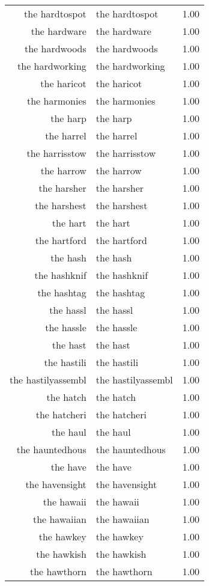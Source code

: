 \begin{table}[ht]
\begin{tabular}{rlr}
  the hardtospot & the hardtospot & 1.00 \\ 
  the hardware & the hardware & 1.00 \\ 
  the hardwoods & the hardwoods & 1.00 \\ 
  the hardworking & the hardworking & 1.00 \\ 
  the haricot & the haricot & 1.00 \\ 
  the harmonies & the harmonies & 1.00 \\ 
  the harp & the harp & 1.00 \\ 
  the harrel & the harrel & 1.00 \\ 
  the harrisstow & the harrisstow & 1.00 \\ 
  the harrow & the harrow & 1.00 \\ 
  the harsher & the harsher & 1.00 \\ 
  the harshest & the harshest & 1.00 \\ 
  the hart & the hart & 1.00 \\ 
  the hartford & the hartford & 1.00 \\ 
  the hash & the hash & 1.00 \\ 
  the hashknif & the hashknif & 1.00 \\ 
  the hashtag & the hashtag & 1.00 \\ 
  the hassl & the hassl & 1.00 \\ 
  the hassle & the hassle & 1.00 \\ 
  the hast & the hast & 1.00 \\ 
  the hastili & the hastili & 1.00 \\ 
  the hastilyassembl & the hastilyassembl & 1.00 \\ 
  the hatch & the hatch & 1.00 \\ 
  the hatcheri & the hatcheri & 1.00 \\ 
  the haul & the haul & 1.00 \\ 
  the hauntedhous & the hauntedhous & 1.00 \\ 
  the have & the have & 1.00 \\ 
  the havensight & the havensight & 1.00 \\ 
  the hawaii & the hawaii & 1.00 \\ 
  the hawaiian & the hawaiian & 1.00 \\ 
  the hawkey & the hawkey & 1.00 \\ 
  the hawkish & the hawkish & 1.00 \\ 
  the hawthorn & the hawthorn & 1.00 \\ 

\end{tabular}
\end{table}
